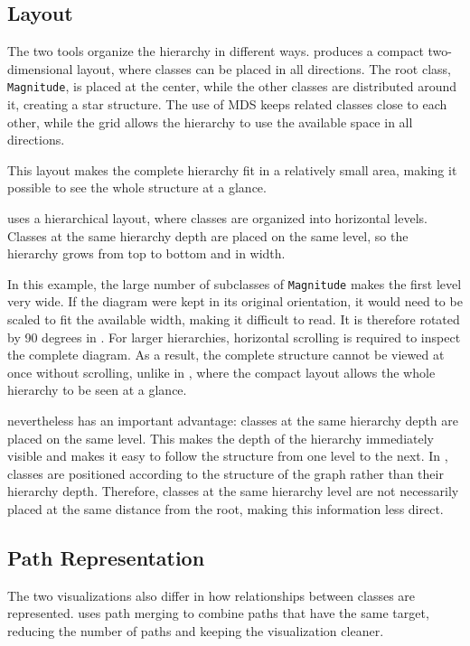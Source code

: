 \documentclass[../../main.tex]{subfiles}
\begin{document}
\subsection{Layout}

The two tools organize the hierarchy in different ways. \wassis produces a compact two-dimensional layout, where classes can be placed in all directions. The root class, \texttt{Magnitude}, is placed at the center, while the other classes are distributed around it, creating a star structure. The use of MDS keeps related classes close to each other, while the grid allows the hierarchy to use the available space in all directions.

This layout makes the complete hierarchy fit in a relatively small area, making it possible to see the whole structure at a glance.

\plantuml uses a hierarchical layout, where classes are organized into horizontal levels. Classes at the same hierarchy depth are placed on the same level, so the hierarchy grows from top to bottom and in width.

In this example, the large number of subclasses of \texttt{Magnitude} makes the first level very wide. If the diagram were kept in its original orientation, it would need to be scaled to fit the available width, making it difficult to read. It is therefore rotated by 90 degrees in . For larger hierarchies, horizontal scrolling is required to inspect the complete diagram. As a result, the complete structure cannot be viewed at once without scrolling, unlike in \wassis, where the compact layout allows the whole hierarchy to be seen at a glance.

\plantuml nevertheless has an important advantage: classes at the same hierarchy depth are placed on the same level. This makes the depth of the hierarchy immediately visible and makes it easy to follow the structure from one level to the next. In \wassis, classes are positioned according to the structure of the graph rather than their hierarchy depth. Therefore, classes at the same hierarchy level are not necessarily placed at the same distance from the root, making this information less direct.

\subsection{Path Representation}

The two visualizations also differ in how relationships between classes are represented. \wassis uses path merging to combine paths that have the same target, reducing the number of paths and keeping the visualization cleaner.
\end{document}
